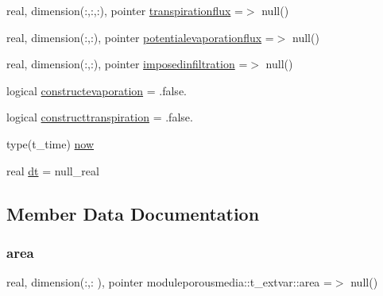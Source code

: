\begin{DoxyCompactItemize}
real, dimension(\+:,\+:,\+:), pointer \mbox{\hyperlink{structmoduleporousmedia_1_1t__extvar_a728fa74aa96df98f38764d0c2083e530}{transpirationflux}} =$>$ null()
\item 
real, dimension(\+:,\+:), pointer \mbox{\hyperlink{structmoduleporousmedia_1_1t__extvar_ab6dc1cc249fe59ecdaf5f14a7e8a3619}{potentialevaporationflux}} =$>$ null()
\item 
real, dimension(\+:,\+:), pointer \mbox{\hyperlink{structmoduleporousmedia_1_1t__extvar_aefd82f7c540b26c7a8c144f13ffe025d}{imposedinfiltration}} =$>$ null()
\item 
logical \mbox{\hyperlink{structmoduleporousmedia_1_1t__extvar_a08ee1629cdc87a6fae697bb287db94be}{constructevaporation}} = .false.
\item 
logical \mbox{\hyperlink{structmoduleporousmedia_1_1t__extvar_ab734dd975881e687065a4f8aaf3208e7}{constructtranspiration}} = .false.
\item 
type(t\+\_\+time) \mbox{\hyperlink{structmoduleporousmedia_1_1t__extvar_a838f80113c01fbdb76128f3ff83f9d7d}{now}}
\item 
real \mbox{\hyperlink{structmoduleporousmedia_1_1t__extvar_aabdf41e64e9e2d3887e4f7133bf70051}{dt}} = null\+\_\+real
\end{DoxyCompactItemize}


\subsection{Member Data Documentation}
\mbox{\label{structmoduleporousmedia_1_1t__extvar_a68b16373ba81fd151cc4e4c620dcddc8}} 
\subsubsection{\texorpdfstring{area}{area}}
{\footnotesize\ttfamily real, dimension(\+:,\+:  ), pointer moduleporousmedia\+::t\+\_\+extvar\+::area =$>$ null()\hspace{0.3cm}{\ttfamily [private]}}

\mbox{\label{structmoduleporousmedia_1_1t__extvar_a9132562c27cf3bc1fcdc7142e0a9c24c}} 
